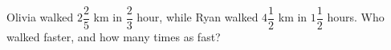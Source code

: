 Olivia walked $2\dfrac{2}{5}$ km in $\dfrac{2}{3}$ hour, while Ryan walked $4\dfrac{1}{2}$ km in $1\dfrac{1}{2}$ hours. Who walked faster, and how many times as fast?
